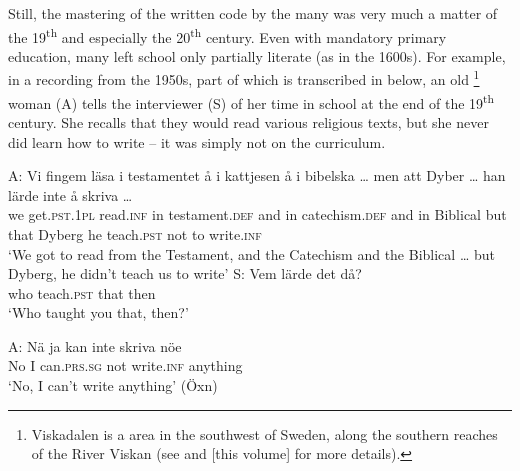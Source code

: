 \documentclass[output=paper]{langscibook}
\begin{document}
Still, the mastering of the written code by the many was very much a matter of the 19\textsuperscript{th} and especially the 20\textsuperscript{th} century. Even with mandatory primary education, many left school only partially literate (as in the 1600s). For example, in a recording from the 1950s, part of which is transcribed in  below, an old \footnote{Viskadalen is a  area in the southwest of Sweden, along the southern reaches of the River Viskan (see \citealt{Petzell2017,Petzell2018} and \citeyear{chapters/07} [this volume] for more details).} woman (A) tells the interviewer (S) of her time in school at the end of the 19\textsuperscript{th} century. She recalls that they would read various religious texts, but she never did learn how to write – it was simply not on the curriculum.


\ea \label{ex:intro:4}
\ea
\gll A:    Vi   fingem                  läsa             i     testamentet            å     i     kattjesen å     i     bibelska … men att   Dyber … han lärde inte   å   {skriva …}\\
     {}     we   get.\textsc{pst.1pl}  read.\textsc{inf} in   testament.\textsc{def} and   in   catechism.\textsc{def} and   in   Biblical   {}       but   that Dyberg   {}    he   teach.\textsc{pst} not   to   write\textsc{.inf}\\
    \glt `We got to read from the Testament, and the Catechism and the Biblical … but Dyberg, he didn’t teach us to write’
\ex
\gll S:     Vem   lärde       det   då?\\
     {}  who    teach.\textsc{pst}  that  then\\
    \glt `Who taught you that, then?’

\gll A:   Nä   ja   kan           inte     skriva     nöe\\
  {} No  I  can\textsc{.prs.sg}   not  write.\textsc{inf}   anything  \\
    \glt `No, I can’t write anything’ (Öxn)
\z
\z
\end{document}
